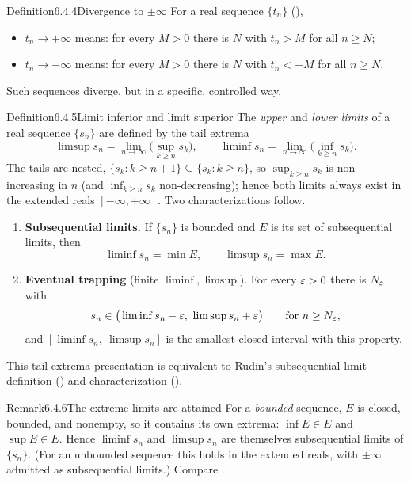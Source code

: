 \documentclass[main.tex]{subfiles}
\begin{document}
\begin{Obj}{Definition}{6.4.4}{Divergence to $\pm\infty$}
For a real sequence $\{t_n\}$ (),
\begin{itemize}[leftmargin=1.3em,topsep=2pt,itemsep=1pt,label=\textbullet]
  \item $t_n\to+\infty$ means: for every $M>0$ there is $N$ with $t_n>M$ for all $n\ge N$;
  \item $t_n\to-\infty$ means: for every $M>0$ there is $N$ with $t_n<-M$ for all $n\ge N$.
\end{itemize}
Such sequences diverge, but in a specific, controlled way.
\end{Obj}

\begin{Obj}{Definition}{6.4.5}{Limit inferior and limit superior}
The \emph{upper} and \emph{lower limits} of a real sequence $\{s_n\}$ are defined by the tail
extrema
\[ \limsup s_n=\lim_{n\to\infty}\Big(\sup_{k\ge n}s_k\Big),\qquad
   \liminf s_n=\lim_{n\to\infty}\Big(\inf_{k\ge n}s_k\Big). \]
The tails are nested, $\{s_k:k\ge n+1\}\subseteq\{s_k:k\ge n\}$, so $\sup_{k\ge n}s_k$ is
non-increasing in $n$ (and $\inf_{k\ge n}s_k$ non-decreasing); hence both limits always exist in
the extended reals $[-\infty,+\infty]$. Two characterizations follow.
\begin{enumerate}[label=\textbf{(\arabic*)},leftmargin=2.2em,topsep=3pt,itemsep=5pt]
  \item \textbf{Subsequential limits.} If $\{s_n\}$ is bounded and $E$ is its set of
        subsequential limits, then
        \[ \liminf s_n=\min E,\qquad \limsup s_n=\max E . \]
  \item \textbf{Eventual trapping} (finite $\liminf,\limsup$). For every $\varepsilon>0$ there is
        $N_\varepsilon$ with
        \[ s_n\in\big(\liminf s_n-\varepsilon,\ \limsup s_n+\varepsilon\big)\qquad\text{for }n\ge N_\varepsilon , \]
and $[\liminf s_n,\ \limsup s_n]$ is the smallest closed interval with this property.
\end{enumerate}
This tail-extrema presentation is equivalent to Rudin's subsequential-limit definition
() and characterization ().
\end{Obj}

\begin{ObjL}{Remark}{6.4.6}{The extreme limits are attained}
For a \emph{bounded} sequence, $E$ is closed, bounded, and nonempty, so it contains its own
extrema: $\inf E\in E$ and $\sup E\in E$. Hence $\liminf s_n$ and $\limsup s_n$ are themselves
subsequential limits of $\{s_n\}$. (For an unbounded sequence this holds in the extended reals,
with $\pm\infty$ admitted as subsequential limits.) Compare .
\end{ObjL}
\end{document}
